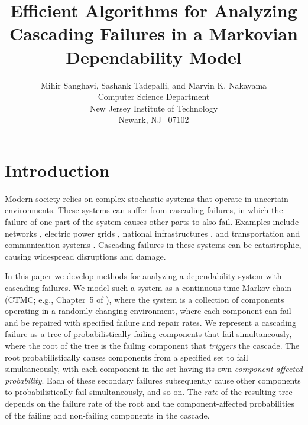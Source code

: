 \documentclass[12pt]{article}
\begin{document}
\title{Efficient Algorithms for
Analyzing Cascading Failures in a
Markovian Dependability Model}
\author{Mihir Sanghavi, Sashank Tadepalli, 
and Marvin K. Nakayama
\\
Computer Science Department
\\
New Jersey Institute of Technology
\\
Newark, NJ \ 07102}
\date{}
\maketitle



\section{Introduction}
\label{sec:intro}

Modern society relies on
complex stochastic systems that operate
in uncertain environments.
These systems can suffer from
cascading failures, in which
the failure of one part of the
system causes other parts to
also fail.
Examples include
networks
\cite{CLM:2004},
electric power grids
\cite{CLDN:2002},
national infrastructures
\cite{Little:2002},
and
transportation and communication systems
\cite{ZGZ:2007}.
Cascading failures in these
systems can be catastrophic,
causing widespread disruptions and
damage.


In this paper we develop methods for
analyzing a dependability
system with cascading failures.
We model such a system as 
a continuous-time
Markov chain (CTMC; e.g., Chapter~5 of
\cite{Ross:1995}),
where the system is 
a collection
of components operating
in a randomly changing environment, 
where each component can
fail and be repaired with
specified failure and repair rates.
We represent a cascading failure as
a tree of probabilistically
failing components that fail
simultaneously, where the
root of the tree is the
failing component that 
\textit{triggers}
the cascade.  The root probabilistically
causes components from a specified
set to
fail simultaneously, with
each component in the set having
its own \textit{component-affected 
probability}.
Each of these secondary
failures subsequently
cause other components to
probabilistically fail simultaneously,
and so on.
The \textit{rate} of
the resulting tree depends on the
failure rate of the root and the
component-affected probabilities
of the failing and non-failing components
in the cascade.
\end{document}
